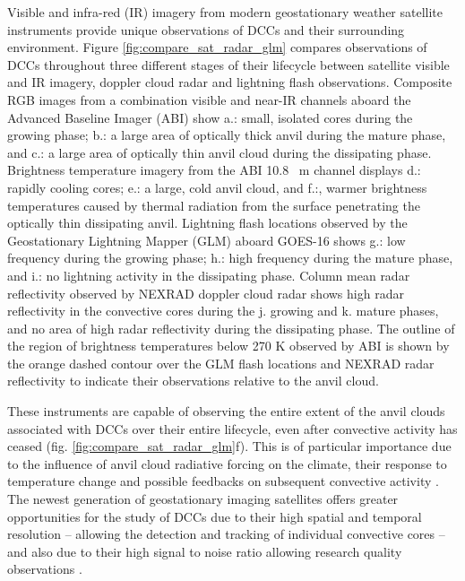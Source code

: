 \documentclass[amt, manuscript]{copernicus}
\begin{document}
Visible and infra-red (IR) imagery from modern geostationary weather satellite instruments provide unique observations of DCCs and their surrounding environment.
Figure \ref{fig:compare_sat_radar_glm} compares observations of DCCs throughout three different stages of their lifecycle between satellite visible and IR imagery, doppler cloud radar and lightning flash observations.
Composite RGB images from a combination visible and near-IR channels aboard the Advanced Baseline Imager (ABI) show a.: small, isolated cores during the growing phase; b.: a large area of optically thick anvil during the mature phase, and c.: a large area of optically thin anvil cloud during the dissipating phase.
Brightness temperature imagery from the ABI 10.8 \unit{\mu m} channel displays d.: rapidly cooling cores; e.: a large, cold anvil cloud, and f.:, warmer brightness temperatures caused by thermal radiation from the surface penetrating the optically thin dissipating anvil. 
Lightning flash locations observed by the Geostationary Lightning Mapper (GLM) aboard GOES-16 shows g.: low frequency during the growing phase; h.: high frequency during the mature phase, and i.: no lightning activity in the dissipating phase. 
Column mean radar reflectivity observed by NEXRAD doppler cloud radar shows high radar reflectivity in the convective cores during the j. growing and k. mature phases, and no area of high radar reflectivity during the dissipating phase. 
The outline of the region of brightness temperatures below 270 \unit{K} observed by ABI is shown by the orange dashed contour over the GLM flash locations and NEXRAD radar reflectivity to indicate their observations relative to the anvil cloud.

These instruments are capable of observing the entire extent of the anvil clouds associated with DCCs over their entire lifecycle, even after convective activity has ceased (fig. \ref{fig:compare_sat_radar_glm}f).
This is of particular importance due to the influence of anvil cloud radiative forcing on the climate, their response to temperature change \citep{bony_thermodynamic_2016, hartmann_tropical_2016, ceppi_cloud_2017, gasparini_what_2019} and possible feedbacks on subsequent convective activity \citep{varble_erroneous_2018}.
The newest generation of geostationary imaging satellites offers greater opportunities for the study of DCCs due to their high spatial and temporal resolution -- allowing the detection and tracking of individual convective cores \citep{heikenfeld_tobac_2019} -- and also due to their high signal to noise ratio allowing research quality observations \citep{iacovazzi_goes-16_2020}.
\end{document}
